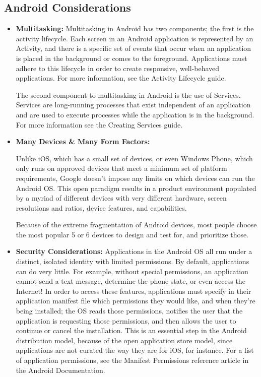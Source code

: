 \subsection{Android Considerations}

\begin{itemize}
\item \textbf{Multitasking: }
Multitasking in Android has two components; the first is the activity lifecycle. Each screen in an Android application is represented by an Activity, and there is a specific set of events that occur when an application is placed in the background or comes to the foreground. Applications must adhere to this lifecycle in order to create responsive, well-behaved applications. For more information, see the Activity Lifecycle guide.

The second component to multitasking in Android is the use of Services. Services are long-running processes that exist independent of an application and are used to execute processes while the application is in the background. For more information see the Creating Services guide.


\item \textbf{Many Devices \& Many Form Factors: }

Unlike iOS, which has a small set of devices, or even Windows Phone, which only runs on approved devices that meet a minimum set of platform requirements, Google doesn’t impose any limits on which devices can run the Android OS. This open paradigm results in a product environment populated by a myriad of different devices with very different hardware, screen resolutions and ratios, device features, and capabilities.

Because of the extreme fragmentation of Android devices, most people choose the most popular 5 or 6 devices to design and test for, and prioritize those.


\item \textbf{ Security Considerations:}
Applications in the Android OS all run under a distinct, isolated identity with limited permissions. By default, applications can do very little. For example, without special permissions, an application cannot send a text message, determine the phone state, or even access the Internet! In order to access these features, applications must specify in their application manifest file which permissions they would like, and when they’re being installed; the OS reads those permissions, notifies the user that the application is requesting those permissions, and then allows the user to continue or cancel the installation. This is an essential step in the Android distribution model, because of the open application store model, since applications are not curated the way they are for iOS, for instance. For a list of application permissions, see the Manifest Permissions reference article in the Android Documentation.

\end{itemize}


